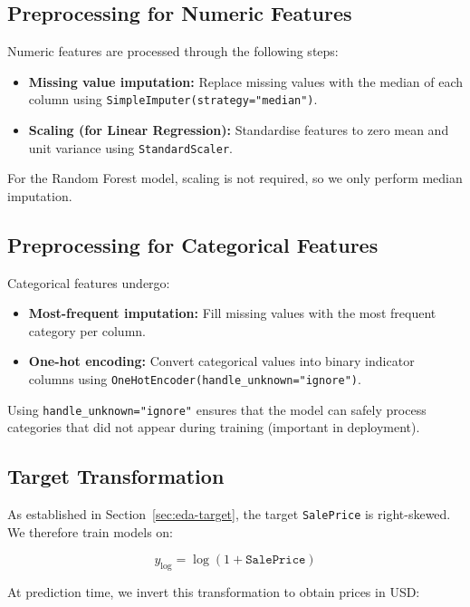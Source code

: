 \documentclass[11pt,a4paper]{article}
\begin{document}
\subsection{Preprocessing for Numeric Features}

Numeric features are processed through the following steps:

\begin{itemize}[leftmargin=*]
    \item \textbf{Missing value imputation:} Replace missing values with the median of each column using \texttt{SimpleImputer(strategy="median")}. 
    \item \textbf{Scaling (for Linear Regression):} Standardise features to zero mean and unit variance using \texttt{StandardScaler}.
\end{itemize}

For the Random Forest model, scaling is not required, so we only perform median imputation.

\subsection{Preprocessing for Categorical Features}

Categorical features undergo:

\begin{itemize}[leftmargin=*]
    \item \textbf{Most-frequent imputation:} Fill missing values with the most frequent category per column.
    \item \textbf{One-hot encoding:} Convert categorical values into binary indicator columns using \texttt{OneHotEncoder(handle\_unknown="ignore")}.
\end{itemize}

Using \texttt{handle\_unknown="ignore"} ensures that the model can safely process categories that did not appear during training (important in deployment).

\subsection{Target Transformation}

As established in Section~\ref{sec:eda-target}, the target \texttt{SalePrice} is right-skewed.
We therefore train models on:

\[
y_{\log} = \log(1 + \texttt{SalePrice})
\]

At prediction time, we invert this transformation to obtain prices in USD:
\end{document}
